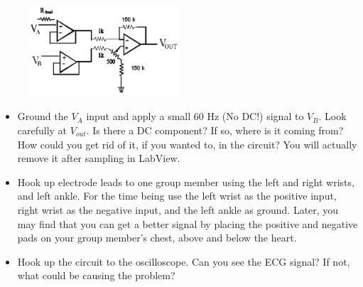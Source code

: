 \documentclass[12pt]{article}
\begin{document}
\begin{figure}[!h]
\begin{center}
\includegraphics[width=0.5\textwidth,trim=0 0 0 0,clip=false]{figures/circuitwithbuffers.png}
\end{center}
\end{figure}


\begin{itemize}
\item Ground the $V_A$ input and apply a small 60 Hz (No DC!) signal to $V_B$. 
Look carefully at $V_{out}$. 
Is there a DC component? 
If so, where is it coming from?
How could you get rid of it, if you wanted to, in the circuit? You will actually remove it after sampling in LabView.
\item Hook up electrode leads to one group member using the left and right wrists, and left ankle. 
For the time being use the left wrist as the positive input, right wrist as the negative input, and the left ankle as ground. 
Later, you may find that you can get a better signal by placing the positive and negative pads on your group member's chest, above and below the heart.
\item Hook up the circuit to the oscilloscope. 
Can you see the ECG signal? 
If not, what could be causing the problem?
\end{itemize}
\end{document}
